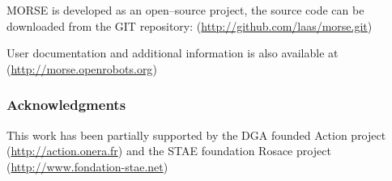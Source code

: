 \documentclass{llncs}
\begin{document}
MORSE is developed as an open--source project, the source code can be
downloaded from the GIT repository:
(\url{http://github.com/laas/morse.git})

User documentation and additional information is also available at
(\url{http://morse.openrobots.org})


\subsubsection*{Acknowledgments}
This work has been partially supported by the DGA founded Action project
(\url{http://action.onera.fr}) and the STAE foundation Rosace project\\
(\url{http://www.fondation-stae.net})



\end{document}
